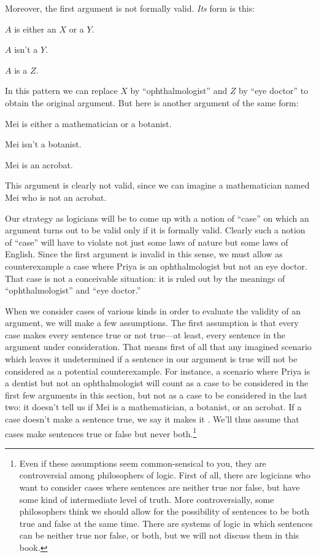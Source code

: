 Moreover, the first argument is not formally valid. \emph{Its} form is this:
\begin{earg}
	\item[] $A$ is either an $X$ or a $Y$.
	\item[] $A$ isn't a $Y$.
	\item[\texttherefore] $A$ is a $Z$.
\end{earg}
In this pattern we can replace $X$ by ``ophthalmologist'' and $Z$ by ``eye doctor'' to obtain the original argument.  But here is another argument of the same form:
\begin{earg}
	\item[] Mei is either a mathematician or a botanist.
	\item[] Mei isn't a botanist.
	\item[\texttherefore] Mei is an acrobat.
\end{earg}
This argument is clearly not valid, since we can imagine a mathematician named Mei who is not an acrobat.

Our strategy as logicians will be to come up with a notion of ``case''
on which an argument turns out to be valid only if it is formally
valid. Clearly such a notion of ``case'' will have to violate not just
some laws of nature but some laws of English. Since the first argument
is invalid in this sense, we must allow as counterexample a case where
Priya is an ophthalmologist but not an eye doctor.  That case is not a
conceivable situation: it is ruled out by the meanings of
``ophthalmologist'' and ``eye doctor.''

When we consider cases of various kinds in order to evaluate the validity of an argument, we will make a few assumptions. The first assumption is that every case makes every sentence true or not true---at least, every sentence in the argument under consideration. That means first of all that any imagined scenario which leaves it undetermined if a sentence in our argument is true will not be considered as a potential counterexample. For instance, a scenario where Priya is a dentist but not an ophthalmologist will count as a case to be considered in the first few arguments in this section, but not as a case to be considered in the last two: it doesn't tell us if Mei is a mathematician, a botanist, or an acrobat. If a case doesn't make a sentence true, we say it makes it . We'll thus assume that cases make sentences true or false but never both.\footnote{Even if these assumptions seem common-sensical to you, they are controversial among philosophers of logic. First of all, there are logicians who want to consider cases where sentences are neither true nor false, but have some kind of intermediate level of truth. More controversially, some philosophers think we should allow for the possibility of sentences to be both true and false at the same time. There are systems of logic in which sentences can be neither true nor false, or both, but we will not discuss them in this book.}

